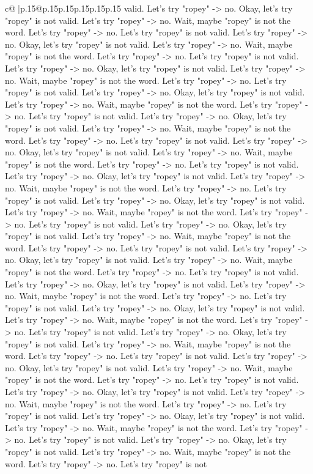 \documentclass{article}
\begin{document}
{\begin{supertabular}{c@{$\;$}|p{.15\linewidth}@{}p{.15\linewidth}p{.15\linewidth}p{.15\linewidth}p{.15\linewidth}p{.15\linewidth}}
{{{valid. Let's try "ropey" {-}> no. Okay, let's try "ropey" is not valid. Let's try "ropey" {-}> no. Wait, maybe "ropey" is not the word. Let's try "ropey" {-}> no. Let's try "ropey" is not valid. Let's try "ropey" {-}> no. Okay, let's try "ropey" is not valid. Let's try "ropey" {-}> no. Wait, maybe "ropey" is not the word. Let's try "ropey" {-}> no. Let's try "ropey" is not valid. Let's try "ropey" {-}> no. Okay, let's try "ropey" is not valid. Let's try "ropey" {-}> no. Wait, maybe "ropey" is not the word. Let's try "ropey" {-}> no. Let's try "ropey" is not valid. Let's try "ropey" {-}> no. Okay, let's try "ropey" is not valid. Let's try "ropey" {-}> no. Wait, maybe "ropey" is not the word. Let's try "ropey" {-}> no. Let's try "ropey" is not valid. Let's try "ropey" {-}> no. Okay, let's try "ropey" is not valid. Let's try "ropey" {-}> no. Wait, maybe "ropey" is not the word. Let's try "ropey" {-}> no. Let's try "ropey" is not valid. Let's try "ropey" {-}> no. Okay, let's try "ropey" is not valid. Let's try "ropey" {-}> no. Wait, maybe "ropey" is not the word. Let's try "ropey" {-}> no. Let's try "ropey" is not valid. Let's try "ropey" {-}> no. Okay, let's try "ropey" is not valid. Let's try "ropey" {-}> no. Wait, maybe "ropey" is not the word. Let's try "ropey" {-}> no. Let's try "ropey" is not valid. Let's try "ropey" {-}> no. Okay, let's try "ropey" is not valid. Let's try "ropey" {-}> no. Wait, maybe "ropey" is not the word. Let's try "ropey" {-}> no. Let's try "ropey" is not valid. Let's try "ropey" {-}> no. Okay, let's try "ropey" is not valid. Let's try "ropey" {-}> no. Wait, maybe "ropey" is not the word. Let's try "ropey" {-}> no. Let's try "ropey" is not valid. Let's try "ropey" {-}> no. Okay, let's try "ropey" is not valid. Let's try "ropey" {-}> no. Wait, maybe "ropey" is not the word. Let's try "ropey" {-}> no. Let's try "ropey" is not valid. Let's try "ropey" {-}> no. Okay, let's try "ropey" is not valid. Let's try "ropey" {-}> no. Wait, maybe "ropey" is not the word. Let's try "ropey" {-}> no. Let's try "ropey" is not valid. Let's try "ropey" {-}> no. Okay, let's try "ropey" is not valid. Let's try "ropey" {-}> no. Wait, maybe "ropey" is not the word. Let's try "ropey" {-}> no. Let's try "ropey" is not valid. Let's try "ropey" {-}> no. Okay, let's try "ropey" is not valid. Let's try "ropey" {-}> no. Wait, maybe "ropey" is not the word. Let's try "ropey" {-}> no. Let's try "ropey" is not valid. Let's try "ropey" {-}> no. Okay, let's try "ropey" is not valid. Let's try "ropey" {-}> no. Wait, maybe "ropey" is not the word. Let's try "ropey" {-}> no. Let's try "ropey" is not valid. Let's try "ropey" {-}> no. Okay, let's try "ropey" is not valid. Let's try "ropey" {-}> no. Wait, maybe "ropey" is not the word. Let's try "ropey" {-}> no. Let's try "ropey" is not valid. Let's try "ropey" {-}> no. Okay, let's try "ropey" is not valid. Let's try "ropey" {-}> no. Wait, maybe "ropey" is not the word. Let's try "ropey" {-}> no. Let's try "ropey" is not valid. Let's try "ropey" {-}> no. Okay, let's try "ropey" is not valid. Let's try "ropey" {-}> no. Wait, maybe "ropey" is not the word. Let's try "ropey" {-}> no. Let's try "ropey" is not }}}
\end{supertabular}}
\end{document}
